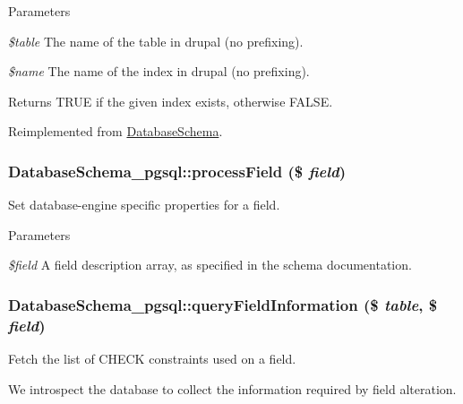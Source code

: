 \begin{DoxyParams}{Parameters}
\item[{\em \$table}]The name of the table in drupal (no prefixing). \item[{\em \$name}]The name of the index in drupal (no prefixing).\end{DoxyParams}
\begin{DoxyReturn}{Returns}
TRUE if the given index exists, otherwise FALSE. 
\end{DoxyReturn}


Reimplemented from \hyperlink{classDatabaseSchema_ae343d2fd453d51d9df43d439af0a22e2}{DatabaseSchema}.\hypertarget{classDatabaseSchema__pgsql_ac951ca95de7746ddd930e8678f0d7f33}{
\subsubsection[{processField}]{\setlength{\rightskip}{0pt plus 5cm}DatabaseSchema\_\-pgsql::processField (\$ {\em field})}}
\label{classDatabaseSchema__pgsql_ac951ca95de7746ddd930e8678f0d7f33}
Set database-\/engine specific properties for a field.


\begin{DoxyParams}{Parameters}
\item[{\em \$field}]A field description array, as specified in the schema documentation. \end{DoxyParams}
\hypertarget{classDatabaseSchema__pgsql_a696ce531f8a2cc71aa295353a0240d7b}{
\subsubsection[{queryFieldInformation}]{\setlength{\rightskip}{0pt plus 5cm}DatabaseSchema\_\-pgsql::queryFieldInformation (\$ {\em table}, \/  \$ {\em field})}}
\label{classDatabaseSchema__pgsql_a696ce531f8a2cc71aa295353a0240d7b}
Fetch the list of CHECK constraints used on a field.

We introspect the database to collect the information required by field alteration.


